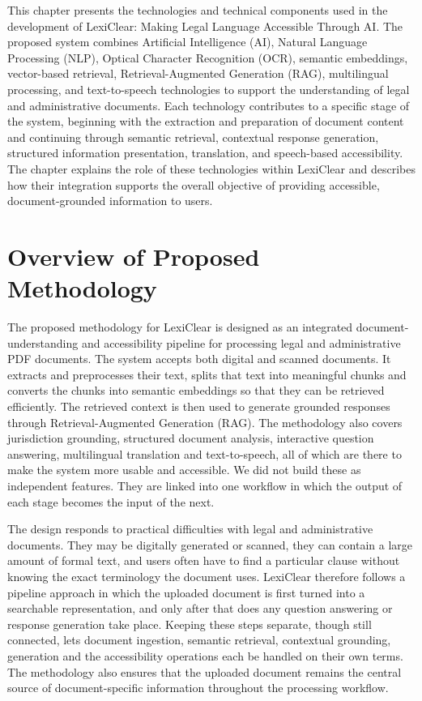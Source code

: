 \documentclass[12pt,a4paper,oneside]{report}
\begin{document}
This chapter presents the technologies and technical components used in the development of LexiClear: Making Legal Language Accessible Through AI. The proposed system combines Artificial Intelligence (AI), Natural Language Processing (NLP), Optical Character Recognition (OCR), semantic embeddings, vector-based retrieval, Retrieval-Augmented Generation (RAG), multilingual processing, and text-to-speech technologies to support the understanding of legal and administrative documents. Each technology contributes to a specific stage of the system, beginning with the extraction and preparation of document content and continuing through semantic retrieval, contextual response generation, structured information presentation, translation, and speech-based accessibility. The chapter explains the role of these technologies within LexiClear and describes how their integration supports the overall objective of providing accessible, document-grounded information to users.

\section{Overview of Proposed Methodology}

The proposed methodology for LexiClear is designed as an integrated
document-understanding and accessibility pipeline for processing legal and
administrative PDF documents. The system accepts both digital and scanned documents. It extracts and preprocesses their text, splits that text into meaningful chunks and converts the chunks into semantic embeddings so that they can be retrieved efficiently. The retrieved context is then used to generate grounded responses through Retrieval-Augmented Generation (RAG). The methodology also covers jurisdiction grounding, structured document analysis, interactive question answering, multilingual translation and text-to-speech, all of which are there to make the system more usable and accessible. We did not build these as independent features. They are linked into one workflow in which the output of each stage becomes the input of the next.

The design responds to practical difficulties with legal and administrative documents. They may be digitally generated or scanned, they can contain a large amount of formal text, and users often have to find a particular clause without knowing the exact terminology the document uses. LexiClear therefore follows a pipeline approach in which the uploaded document is first turned into a searchable representation, and only after that does any question answering or response generation take place. Keeping these steps separate, though still connected, lets document ingestion, semantic retrieval, contextual grounding, generation and the accessibility operations each be handled on their own terms. The methodology
also ensures that the uploaded document remains the central source of
document-specific information throughout the processing workflow.
\end{document}
